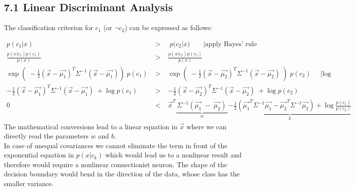 \documentclass[10pt,a4paper]{article}
\begin{document}
\pagestyle{fancy}

\subsection*{7.1 Linear Discriminant Analysis}

The classification criterion for $c_1$ (or $\lnot c_2$) can be expressed as follows:

\begin{eqnarray}
p(c_1|x)\; &\;>\;&\; p(c_2|x)\;\;\;\;\;\;\;| \mbox{apply Bayes' rule}\\
\frac{p(x|c_1) p(c_1)}{p(x)} &\;>\;& \frac{p(x|c_2) p(c_2)}{p(x)}\\
\exp(\; -\frac{1}{2}(\vec{x}-\vec{\mu_1})^T \Sigma^{-1} (\vec{x}-\vec{\mu_1}))\;p(c_1) &\;>\;& \exp(\; -\frac{1}{2}(\vec{x}-\vec{\mu_2})^T \Sigma^{-1} (\vec{x}-\vec{\mu_2}) \;)\;p(c_2)\;\;\;\;\;| \mbox{log} \\
 -\frac{1}{2}(\vec{x}-\vec{\mu_1})^T \Sigma^{-1} (\vec{x}-\vec{\mu_1})\; + \log{p(c_1)} &\; > \;& -\frac{1}{2}(\vec{x}-\vec{\mu_2})^T \Sigma^{-1} (\vec{x}-\vec{\mu_2}) \; + \log{p(c_2)} \\
0 &\; < \;& \vec{x}^T \underbrace{\,\Sigma^{-1}(\vec{\mu_1}\;-\;\vec{\mu_2})\;}_{w} \underbrace{- \frac{1}{2}( \vec{\mu_1}^T \Sigma^{-1} \vec{\mu_1} - \vec{\mu_2}^T \Sigma^{-1} \vec{\mu_2}) + \log{\frac{p(c_1)}{p(c_2)}} }_{b}
\end{eqnarray}
\noindent
The mathematical conversions lead to a linear equation in $\vec{x}$ where we can directly read the parameters $w$ and $b$.\\
In case of unequal covariances we cannot eliminate the term in front of the exponential equation in $p(x|c_k)$ which would lead us to a nonlinear result and therefore would require a nonlinear connectionist neuron.
The shape of the decision boundary would bend in the direction of the data, whose class has the smaller variance.
\end{document}
